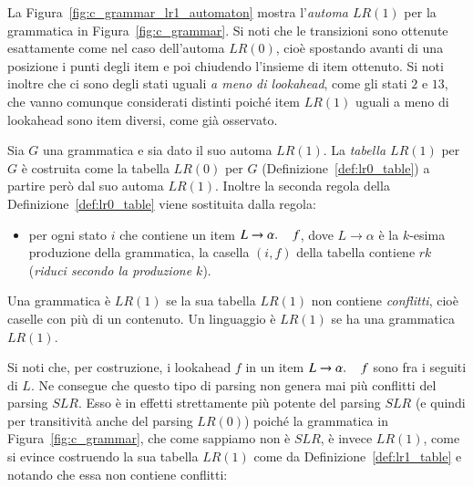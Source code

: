 La Figura~\ref{fig:c_grammar_lr1_automaton} mostra
l'\emph{automa $\mathit{LR}(1)$} per la grammatica
in Figura~\ref{fig:c_grammar}. Si noti che le transizioni sono ottenute
esattamente come nel caso dell'automa $\mathit{LR}(0)$,
cio\`e spostando avanti di una
posizione i punti degli item e poi chiudendo l'insieme di item \cosi
ottenuto. Si noti inoltre che ci sono degli
stati uguali \emph{a meno di lookahead}, come gli stati $2$ e $13$,
che vanno comunque considerati distinti poich\'e item $\mathit{LR}(1)$ uguali
a meno di lookahead sono item diversi, come gi\`a osservato.
%
\begin{definition}\label{def:lr1_table}
Sia $G$ una grammatica e sia dato il suo automa $\mathit{LR}(1)$.
La \emph{tabella $\mathit{LR}(1)$} per $G$ \`e costruita come
la tabella $\mathit{LR}(0)$ per $G$ (Definizione~\ref{def:lr0_table})
a partire per\`o dal suo automa $\mathit{LR}(1)$. Inoltre la seconda
regola della Definizione~\ref{def:lr0_table} viene sostituita dalla regola:
\begin{itemize}
\item per ogni stato $i$ che contiene un item $L\to\alpha.\,\quad f$, dove
      $L\to\alpha$ \`e la $k$-esima produzione della grammatica, la casella
      $(i,f)$ della tabella contiene $rk$
      (\emph{riduci secondo la produzione $k$}).
\end{itemize}
\end{definition}
%
\begin{definition}\label{def:lr1_grammar}
Una grammatica \`e $\mathit{LR}(1)$ se la sua tabella $\mathit{LR}(1)$ non
contiene \emph{conflitti},
cio\`e caselle con pi\`u di un contenuto. Un linguaggio \`e $\mathit{LR}(1)$ se
ha una grammatica $\mathit{LR}(1)$.
\end{definition}
%
\noindent
Si noti che, per costruzione, i lookahead $f$ in un item
$L\to\alpha.\,\quad f$ sono fra i seguiti di $L$. Ne consegue che
questo tipo di parsing non genera mai pi\`u conflitti del parsing
$\mathit{SLR}$. Esso \`e in effetti strettamente pi\`u potente del
parsing $\mathit{SLR}$ (e quindi per transitivit\`a anche del parsing
$\mathit{LR}(0)$) poich\'e la grammatica in Figura~\ref{fig:c_grammar}, che
come sappiamo non \`e $\mathit{SLR}$,
\`e invece $\mathit{LR}(1)$, come si evince
costruendo la sua tabella $\mathit{LR}(1)$ come da
Definizione~\ref{def:lr1_table} e notando che essa non contiene conflitti:
%
